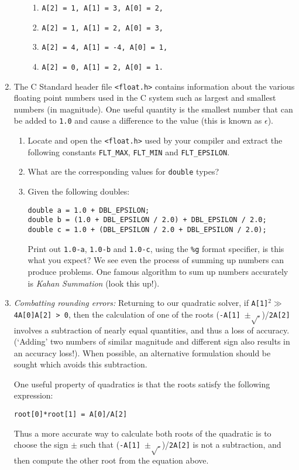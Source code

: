 \documentclass[a4paper,12pt]{article}
\begin{document}
\begin{enumerate}
\begin{enumerate}
\begin{multicols}{2}
\begin{enumerate}
\item \tt A[2] = 1, A[1] = 3, A[0] = 2,
\item \tt A[2] = 1, A[1] = 2, A[0] = 3,
\item \tt A[2] = 4, A[1] = -4, A[0] = 1,
\item \tt A[2] = 0, A[1] = 2, A[0] = 1.
\end{enumerate}
\end{multicols}
\end{enumerate}
\item The C Standard header file {\tt <float.h>} contains information about the various floating point numbers used in the C system such as largest and smallest numbers (in magnitude). One useful quantity is the smallest number that can be added to {\tt 1.0} and cause a difference to the value (this is known as $\epsilon$).
\begin{enumerate}
\item Locate and open the {\tt <float.h>} used by your compiler and extract the following constants {\tt FLT\_MAX}, {\tt FLT\_MIN} and {\tt FLT\_EPSILON}.
\item What are the corresponding values for {\tt double} types?
\item Given the following doubles:
\begin{verbatim}
double a = 1.0 + DBL_EPSILON;
double b = (1.0 + DBL_EPSILON / 2.0) + DBL_EPSILON / 2.0;
double c = 1.0 + (DBL_EPSILON / 2.0 + DBL_EPSILON / 2.0);
\end{verbatim}
Print out {\tt 1.0-a}, {\tt 1.0-b} and {\tt 1.0-c}, using the \verb|%g| format specifier, is this what you expect? We see even the process of summing up numbers can produce problems. One famous algorithm to sum up numbers accurately is \emph{Kahan Summation} (look this up!).
\end{enumerate}
\newpage

\item \emph{Combatting rounding errors:} Returning to our quadratic solver, if {\tt A[1]$^2 \gg$ 4A[0]A[2] > 0}, then the calculation of one of the roots ({\tt -A[1] $\pm \sqrt{.}$})/{\tt 2A[2]} involves a subtraction of nearly equal quantities, and thus a loss of accuracy. (`Adding' two numbers of similar magnitude and different sign also results in an accuracy loss!). When possible, an alternative formulation should be sought which avoids this subtraction.

One useful property of quadratics is that the roots satisfy the following expression:
\begin{center}
\tt root[0]*root[1] = A[0]/A[2]
\end{center}
Thus a more accurate way to calculate both roots of the quadratic is to choose the sign $\pm$ such that ({\tt -A[1] $\pm \sqrt{.}$})/{\tt 2A[2]} is not a subtraction, and then compute the other root from the equation above.


\end{enumerate}
\end{document}
